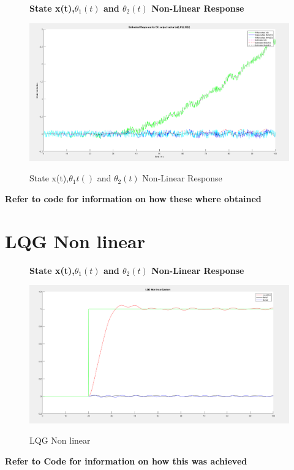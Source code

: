 \documentclass[12pt]{article}
\begin{document}
\begin{figure}[H]
    \centering
    \textbf{State x(t),$\theta_1(t)$ and $\theta_2(t)$ Non-Linear Response}\par\medskip
    \includegraphics[scale = 0.35]{StateXth1th2NonLinearResponse.png}\\[0.0 cm]	%
    \caption{State x(t),$\theta_1t()$ and $\theta_2(t)$ Non-Linear Response} 
\end{figure}

\textbf{Refer to code for information on how these where obtained}

\section{LQG Non linear}
\begin{figure}[H]
    \centering
    \textbf{State x(t),$\theta_1(t)$ and $\theta_2(t)$ Non-Linear Response}\par\medskip
    \includegraphics[scale = 0.35]{lqgNonlinear.png}\\[0.0 cm]	%
    \caption{LQG Non linear} 
\end{figure}
\textbf{Refer to Code for information on how this was achieved}
\end{document}

